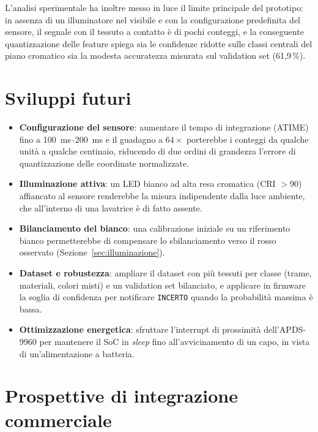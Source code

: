 \documentclass[11pt,a4paper,twoside,openany]{report}
\begin{document}
L'analisi sperimentale ha inoltre messo in luce il limite principale
del prototipo: in assenza di un illuminatore nel visibile e con la
configurazione predefinita del sensore, il segnale con il tessuto a
contatto è di pochi conteggi, e la conseguente quantizzazione delle
feature spiega sia le confidenze ridotte sulle classi centrali del piano
cromatico sia la modesta accuratezza misurata sul validation set
(61,9\,\%).

\section{Sviluppi futuri}

\begin{itemize}
  \item \textbf{Configurazione del sensore}: aumentare il tempo di
        integrazione (ATIME) fino a \SIrange{100}{200}{ms} e il guadagno
        a $64\times$ porterebbe i conteggi da qualche unità a qualche
        centinaio, riducendo di due ordini di grandezza l'errore di
        quantizzazione delle coordinate normalizzate.
  \item \textbf{Illuminazione attiva}: un LED bianco ad alta resa
        cromatica (CRI $> 90$) affiancato al sensore renderebbe la
        misura indipendente dalla luce ambiente, che all'interno di una
        lavatrice è di fatto assente.
  \item \textbf{Bilanciamento del bianco}: una calibrazione iniziale su
        un riferimento bianco permetterebbe di compensare lo
        sbilanciamento verso il rosso osservato
        (Sezione~\ref{sec:illuminazione}).
  \item \textbf{Dataset e robustezza}: ampliare il dataset con più
        tessuti per classe (trame, materiali, colori misti) e un
        validation set bilanciato, e applicare in firmware la soglia di
        confidenza per notificare \texttt{INCERTO} quando la
        probabilità massima è bassa.
  \item \textbf{Ottimizzazione energetica}: sfruttare l'interrupt di
        prossimità dell'APDS-9960 per mantenere il SoC in
        \textit{sleep} fino all'avvicinamento di un capo, in vista di
        un'alimentazione a batteria.
\end{itemize}

\section{Prospettive di integrazione commerciale}
\end{document}
